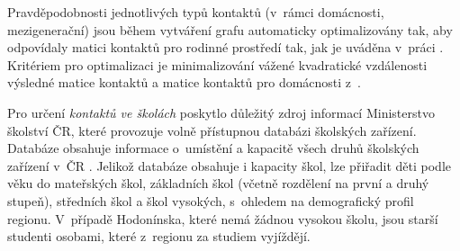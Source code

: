 Pravděpodobnosti jednotlivých typů kontaktů (v~rámci domácnosti, me\-zi\-ge\-ne\-rač\-ní) jsou během vytváření grafu automaticky optimalizovány tak, aby odpovídaly matici kontaktů pro rodinné prostředí tak, jak je uváděna v~práci \cite{Prem_etal2017}. Kritériem pro optimalizaci je 
minimalizování vážené kvadratické vzdálenosti výsledné matice kontaktů a matice kontaktů pro domácnosti z~\cite{Prem_etal2017}.




Pro určení \emph{kontaktů ve školách} poskytlo důležitý zdroj informací Ministerstvo školství ČR, které provozuje volně přístupnou databázi školských zařízení. Databáze obsahuje informace o~umístění a kapacitě všech druhů školských zařízení v~ČR \cite{zaj:skolskazarizeni}. Jelikož databáze obsahuje i kapacity škol, lze přiřadit děti podle věku do mateřských škol, základních škol (včetně rozdělení na první a druhý stupeň), středních škol a škol vysokých, s~ohledem na demografický profil regionu. V~případě Hodonínska, které nemá žádnou vysokou školu, jsou starší studenti osobami, které z~regionu za studiem vyjíždějí.

